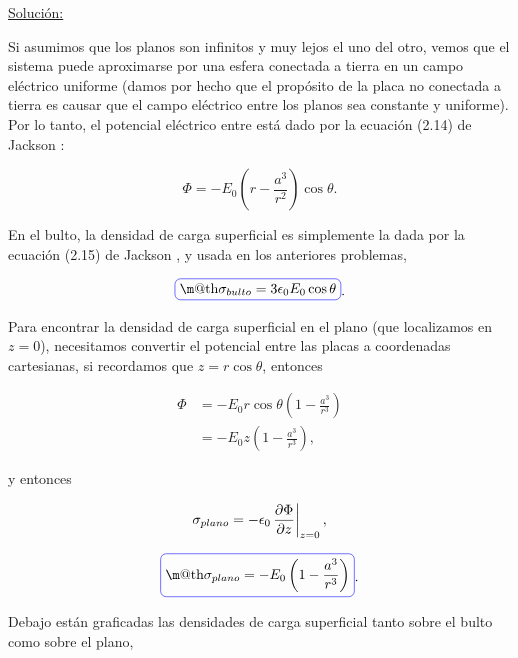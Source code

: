 \documentclass[a4paper,10pt]{article}
\makeatletter
\numberwithin{equation}{section}
\newcommand{\zerodel}{.\kern-\nulldelimiterspace}
\newcommand*{\boxcolor}{blue}
\renewcommand{\boxed}[1]{\textcolor{\boxcolor}{%
\tikz[baseline={([yshift=-1ex]current bounding box.center)}] \node [rectangle, minimum width=1ex,rounded corners,draw] {\normalcolor\m@th$\displaystyle#1$};}}
\makeatother
\begin{document}
\vspace{.3cm}

\underline{Solución:} \vspace{.3cm}

Si asumimos que los planos son infinitos y muy lejos el uno del otro, vemos que 
el sistema puede aproximarse por una esfera conectada a tierra en un campo eléctrico 
uniforme (damos por hecho que el propósito de la placa no conectada a tierra es 
causar que el campo eléctrico entre los planos sea constante y uniforme). Por lo tanto, 
el potencial eléctrico entre está dado por la ecuación (2.14) de Jackson \cite{jackson3}: 

\begin{equation}
 \Phi = - E_0\left(r - \frac{a^3}{r^2}\right)\cos{\theta}.
\end{equation}

En el bulto, la densidad de carga superficial es simplemente la dada por la ecuación 
(2.15) de Jackson \cite{jackson3}, y usada en los anteriores problemas, 

\begin{equation}
 \boxed{\sigma_{bulto} = 3\epsilon_0 E_0 \cos{\theta}}.
\end{equation}

Para encontrar la densidad de carga superficial en el plano (que localizamos en 
$z=0$), necesitamos convertir el potencial entre las placas a coordenadas 
cartesianas, si recordamos que $z = r\cos{\theta}$, entonces 

\begin{align*}
 \Phi &= - E_0 r \cos{\theta}\left(1 - \frac{a^3}{r^3}\right) \\
 &= - E_0 z \left(1 - \frac{a^3}{r^3}\right),
\end{align*}

y entonces 

\begin{equation}
 \sigma_{plano} = - \epsilon_0 \left\zerodel\frac{\partial \Phi}{\partial z}\right|_{z=0},
\end{equation}

\begin{equation}
 \boxed{\sigma_{plano} = - E_0 \left(1 - \frac{a^3}{r^3}\right)}.
\end{equation}

Debajo están graficadas las densidades de carga superficial tanto sobre el bulto 
como sobre el plano,
\end{document}
